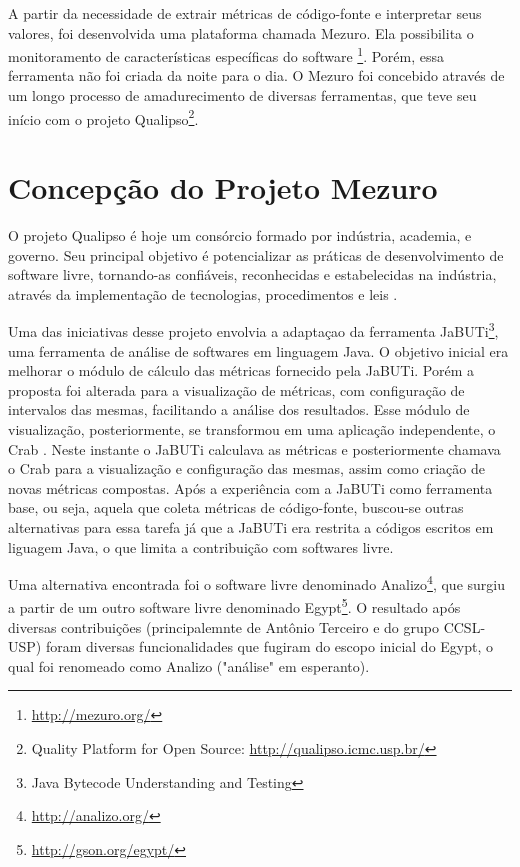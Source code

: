 
A partir da necessidade de extrair métricas de código-fonte e interpretar seus valores, foi desenvolvida uma plataforma chamada Mezuro. Ela possibilita o monitoramento de características específicas do software \footnote{\url{http://mezuro.org/}}. Porém, essa ferramenta não foi criada da noite para o dia. O Mezuro foi concebido através de um longo processo de amadurecimento de diversas ferramentas, que teve seu início com o projeto Qualipso\footnote{Quality Platform for Open Source: \url{http://qualipso.icmc.usp.br/}}.

\section{Concepção do Projeto Mezuro}

O projeto Qualipso é hoje um consórcio formado por indústria, academia, e governo. Seu principal objetivo é potencializar as práticas de desenvolvimento de software livre, tornando-as confiáveis, reconhecidas e estabelecidas na indústria, através da implementação de tecnologias, procedimentos e leis \cite{qualipso2009}. 
	
Uma das iniciativas desse projeto envolvia  a adaptaçao da ferramenta JaBUTi\footnote{Java Bytecode Understanding and Testing}, uma ferramenta de análise de softwares em linguagem Java. O objetivo inicial era melhorar o módulo de cálculo das métricas fornecido pela JaBUTi. Porém a proposta foi alterada para a visualização de métricas, com configuração de intervalos das mesmas, facilitando a análise dos resultados. Esse módulo de visualização, posteriormente, se transformou em uma aplicação independente, o Crab \cite{meirelles2009crab}. Neste instante o JaBUTi calculava as métricas e posteriormente chamava o Crab para a visualização e configuração das mesmas,  assim como criação de novas métricas compostas. Após a experiência com a JaBUTi como ferramenta base, ou seja, aquela que coleta métricas de código-fonte, buscou-se outras alternativas para essa tarefa já que a JaBUTi era restrita a códigos escritos  em liguagem Java, o que limita a contribuição com softwares livre.

Uma alternativa encontrada foi o software livre denominado Analizo\footnote{\url{http://analizo.org/}}, que surgiu a partir de um outro software livre denominado Egypt\footnote{\url{http://gson.org/egypt/}}. O resultado após diversas contribuições (principalemnte de Antônio Terceiro e do grupo CCSL-USP) foram diversas funcionalidades que fugiram do escopo inicial do Egypt, o qual foi renomeado como Analizo ("análise" em esperanto). %

